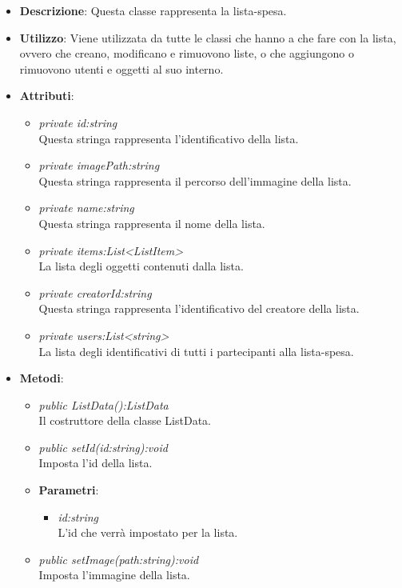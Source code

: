 \begin{itemize}
\item \textbf{Descrizione}: Questa classe rappresenta la lista-spesa.
\item \textbf{Utilizzo}: Viene utilizzata da tutte le classi che hanno a che fare con la lista, ovvero che creano, modificano e rimuovono liste, o che aggiungono o rimuovono utenti e oggetti al suo interno.
\item \textbf{Attributi}: 
	\begin{itemize}
	\item \textit{private id:string}\\
	Questa stringa rappresenta l'identificativo della lista.
	\item \textit{private imagePath:string}\\
	Questa stringa rappresenta il percorso dell'immagine della lista.
	\item \textit{private name:string}\\
	Questa stringa rappresenta il nome della lista.
	\item \textit{private items:List<ListItem>}\\
	La lista degli oggetti contenuti dalla lista.
	\item \textit{private creatorId:string}\\
	Questa stringa rappresenta l'identificativo del creatore della lista.
	\item \textit{private users:List<string>}\\
	La lista degli identificativi di tutti i partecipanti alla lista-spesa.
	\end{itemize}
\item \textbf{Metodi}:
	\begin{itemize}
	\item \textit{public ListData():ListData}\\
	Il costruttore della classe ListData.
	\item \textit{public setId(id:string):void}\\
	Imposta l'id della lista.
				\item{\textbf{Parametri}: \begin{itemize}
				\item \textit{id:string}\\
				L'id che verrà impostato per la lista.
			\end{itemize}}
	\item \textit{public setImage(path:string):void}\\
	Imposta l'immagine della lista.

\end{itemize}
\end{itemize}

